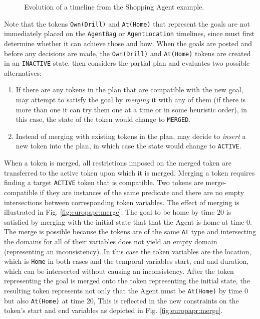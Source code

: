 \begin{description}
\begin{figure}[t]
    \caption{\small Evolution of a timeline from the Shopping Agent example.}
  \end{figure}


  Note that the tokens \texttt{Own(Drill)} and \texttt{At(Home)} that
  represent the goals are not immediately placed on the
  \texttt{AgentBag} or \texttt{AgentLocation} timelines, since \eu
  must first determine whether it can achieve those 
  and how. When the goals are posted and before any decisions are
  made, the \texttt{Own(Drill)} and \texttt{At(Home)} tokens are
  created in an \texttt{INACTIVE} state. \eu then considers the
  partial plan and evaluates two possible alternatives:

\begin{enumerate}

\item If there are any tokens in the plan that are compatible with the
  new goal, \eu may attempt to satisfy the goal by \emph{merging} it
  with any of them (if there is more than one it can try them one at a
  time or in some heuristic order), in this case, the state of the
  token would change to \texttt{MERGED}.

\item Instead of merging with existing tokens in the plan, \eu may
  decide to \emph{insert} a new token into the plan, in which case the
  state would change to \texttt{ACTIVE}.

\end{enumerate}

When a token is merged, all restrictions imposed on the merged token
are transferred to the active token upon which it is merged. Merging a
token requires finding a target \texttt{ACTIVE} token that is
compatible. Two tokens are merge-compatible if they are instances of
the same predicate and there are no empty intersections between
corresponding token variables.  The effect of merging is illustrated
in Fig. \ref{fig:europapr:merge}. The goal to be home by time $20$ is
satisfied by merging with the initial state that 
that the Agent is home at time $0$.  The merge is possible because the
tokens are of the same \texttt{At} type and intersecting the domains
for all of their variables does not yield an empty domain (representing
an inconsistency). In this case the token variables are the location,
which is \texttt{Home} in both cases and the temporal variables start,
end and duration, which can be intersected without causing an
inconsistency. After the token representing the goal is merged onto
the token representing the initial state, the resulting token
represents not only that the Agent must be \texttt{At(Home)} by time
$0$ but also \texttt{At(Home)} at time $20$, This is reflected in the
new constraints on the token's start and end variables as depicted in
Fig. \ref{fig:europapr:merge}.


\end{description}
